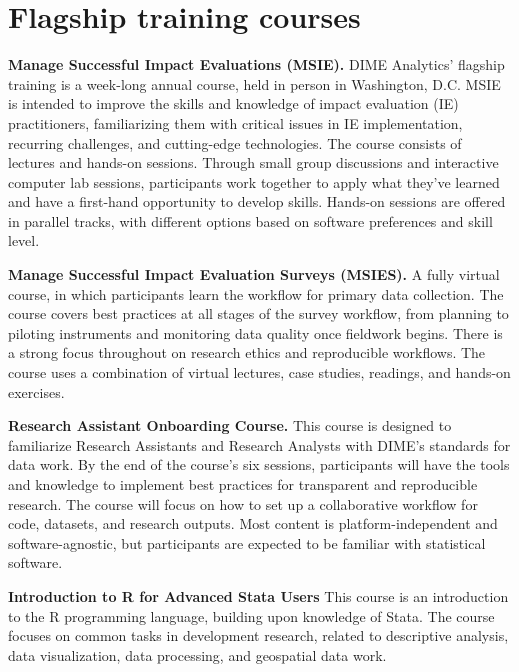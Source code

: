 
\section{Flagship training courses}

\textbf{Manage Successful Impact Evaluations (MSIE).}
DIME Analytics' flagship training is a week-long annual course,
held in person in Washington, D.C.
MSIE is intended to improve the skills and knowledge of
impact evaluation (IE) practitioners,
familiarizing them with critical issues in
IE implementation, recurring challenges,
and cutting-edge technologies.
The course consists of lectures and hands-on sessions.
Through small group discussions and interactive computer lab sessions,
participants work together to apply what they've learned
and have a first-hand opportunity to develop skills.
Hands-on sessions are offered in parallel tracks,
with different options based on software preferences and skill level.

\resourcepar\textbf{Manage Successful Impact Evaluation Surveys (MSIES).}
A fully virtual course,
in which participants learn the workflow for primary data collection.
The course covers best practices at all stages of the survey workflow,
from planning to piloting instruments
and monitoring data quality once fieldwork begins.
There is a strong focus throughout on research ethics and reproducible workflows.
The course uses a combination of virtual lectures,
case studies, readings, and hands-on exercises.

\resourcepar\textbf{Research Assistant Onboarding Course.}
This course is designed to familiarize Research Assistants and Research Analysts
with DIME's standards for data work.
By the end of the course's six sessions,
participants will have the tools and knowledge to
implement best practices for transparent and reproducible research.
The course will focus on how to set up a collaborative workflow for
code, datasets, and research outputs.
Most content is platform-independent and software-agnostic,
but participants are expected to be familiar with statistical software.

\resourcepar\textbf{Introduction to R for Advanced Stata Users}
This course is an introduction to the R programming language,
building upon knowledge of Stata.
The course focuses on common tasks in
development research, related to descriptive analysis,
data visualization, data processing, and geospatial data work.

